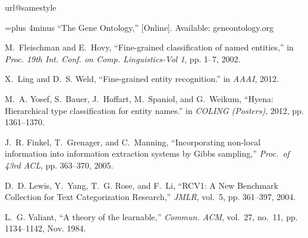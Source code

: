 \documentclass[10pt, conference, compsocconf]{IEEEtran}
\begin{document}
% 


\begin{small}
\begin{thebibliography}{10}
\providecommand{\url}[1]{#1}
\csname url@samestyle\endcsname
\providecommand{\newblock}{\relax}
\providecommand{\bibinfo}[2]{#2}
\providecommand{\BIBentrySTDinterwordspacing}{\spaceskip=0pt\relax}
\providecommand{\BIBentryALTinterwordstretchfactor}{4}
\providecommand{\BIBentryALTinterwordspacing}{\spaceskip=\fontdimen2\font plus
\BIBentryALTinterwordstretchfactor\fontdimen3\font minus
  \fontdimen4\font\relax}
\providecommand{\BIBforeignlanguage}[2]{{%
\expandafter\ifx\csname l@#1\endcsname\relax
\typeout{** WARNING: IEEEtran.bst: No hyphenation pattern has been}%
\typeout{** loaded for the language `#1'. Using the pattern for}%
\typeout{** the default language instead.}%
\else
\language=\csname l@#1\endcsname
\fi
#2}}
\providecommand{\BIBdecl}{\relax}
\BIBdecl

\BIBentryALTinterwordspacing
``The {Gene} {Ontology},'' [Online]. Available:
  \url{geneontology.org}
\BIBentrySTDinterwordspacing

M.~Fleischman and E.~Hovy, ``Fine-grained classification of named entities,''
  in \emph{Proc. 19th Int. Conf. on Comp.
  Linguistics-Vol 1}, pp. 1--7,  2002. 

X.~Ling and D.~S. Weld, ``Fine-grained entity recognition.'' in \emph{AAAI},
  2012.

M.~A. Yosef, S.~Bauer, J.~Hoffart, M.~Spaniol, and G.~Weikum, ``Hyena:
  Hierarchical type classification for entity names.'' in \emph{COLING
  (Posters)}, 2012, pp. 1361--1370.

J.~R. Finkel, T.~Grenager, and C.~Manning, ``Incorporating non-local
  information into information extraction systems by Gibbs sampling,'' 
  \emph{Proc.~of 43rd ACL}, pp. 363--370, 2005.

D.~D. Lewis, Y.~Yang, T.~G. Rose, and F.~Li, ``{RCV1: A New Benchmark
  Collection for Text Categorization Research},'' \emph{JMLR},
  vol.~5, pp. 361--397, 2004.

L.~G. Valiant, ``A theory of the learnable,'' \emph{Commun. ACM}, vol.~27,
  no.~11, pp. 1134--1142, Nov. 1984.


\end{thebibliography}
\end{small}
\end{document}
